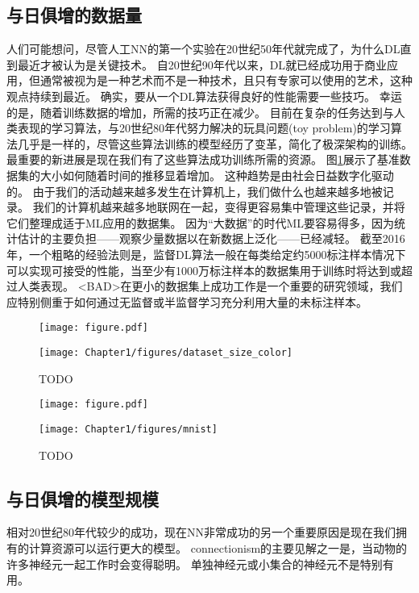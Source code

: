 \subsection{与日俱增的数据量}
\label{sec:increasing_dataset_sizes}
人们可能想问，尽管人工\gls{NN}的第一个实验在20世纪50年代就完成了，为什么\gls{DL}直到最近才被认为是关键技术。
自20世纪90年代以来，\gls{DL}就已经成功用于商业应用，但通常被视为是一种艺术而不是一种技术，且只有专家可以使用的艺术，这种观点持续到最近。
确实，要从一个\gls{DL}算法获得良好的性能需要一些技巧。
幸运的是，随着训练数据的增加，所需的技巧正在减少。
目前在复杂的任务达到与人类表现的学习算法，与20世纪80年代努力解决的玩具问题(toy problem)的学习算法几乎是一样的，尽管这些算法训练的模型经历了变革，简化了极深架构的训练。
最重要的新进展是现在我们有了这些算法成功训练所需的资源。
图\ref{fig:chap1_dataset_size_color}展示了基准数据集的大小如何随着时间的推移显着增加。
这种趋势是由社会日益数字化驱动的。
由于我们的活动越来越多发生在计算机上，我们做什么也越来越多地被记录。
我们的计算机越来越多地联网在一起，变得更容易集中管理这些记录，并将它们整理成适于\gls{ML}应用的数据集。
因为``大数据''的时代\gls{ML}要容易得多，因为统计估计的主要负担——观察少量数据以在新数据上泛化——已经减轻。
截至2016年，一个粗略的经验法则是，监督\gls{DL}算法一般在每类给定约5000标注样本情况下可以实现可接受的性能，当至少有1000万标注样本的数据集用于训练时将达到或超过人类表现。
<BAD>在更小的数据集上成功工作是一个重要的研究领域，我们应特别侧重于如何通过无监督或半监督学习充分利用大量的未标注样本。
\begin{figure}[!htb]
\ifOpenSource
\centerline{\texttt{[image: figure.pdf]}}
\else
\centerline{\texttt{[image: Chapter1/figures/dataset\_size\_color]}}
\fi
\caption{TODO}
\label{fig:chap1_dataset_size_color}
\end{figure}
\begin{figure}[!htb]
\ifOpenSource
\centerline{\texttt{[image: figure.pdf]}}
\else
\centerline{\texttt{[image: Chapter1/figures/mnist]}}
\fi
\caption{TODO}
\label{fig:chap1_mnist}
\end{figure}


\subsection{与日俱增的模型规模}
\label{sec:increasing_model_sizes}

相对20世纪80年代较少的成功，现在\gls{NN}非常成功的另一个重要原因是现在我们拥有的计算资源可以运行更大的模型。
\gls{connectionism}的主要见解之一是，当动物的许多神经元一起工作时会变得聪明。
单独神经元或小集合的神经元不是特别有用。

